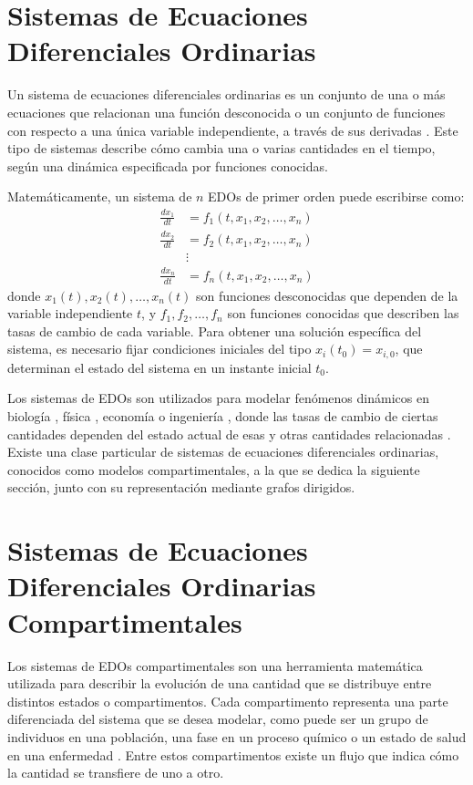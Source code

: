 \section{Sistemas de Ecuaciones Diferenciales Ordinarias}
\label{sec:edos}

Un sistema de ecuaciones diferenciales ordinarias es un conjunto de una o más ecuaciones que relacionan una función desconocida o un conjunto de funciones 
con respecto a una única variable independiente, a través de sus derivadas \cite{BoyceDiPrima17, Zill13}. Este tipo de sistemas describe cómo cambia una o varias 
cantidades en el tiempo, según una dinámica especificada por funciones conocidas.

Matemáticamente, un sistema de \( n \) EDOs de primer orden puede escribirse como:
\begin{align*}
\frac{dx_1}{dt} &= f_1(t, x_1, x_2, \ldots, x_n) \\
\frac{dx_2}{dt} &= f_2(t, x_1, x_2, \ldots, x_n) \\
&\vdots \\
\frac{dx_n}{dt} &= f_n(t, x_1, x_2, \ldots, x_n)
\end{align*}
donde \( x_1(t), x_2(t), \ldots, x_n(t) \) son funciones desconocidas que dependen de la variable independiente \( t \), y \( f_1, f_2, \ldots, f_n \) son funciones 
conocidas que describen las tasas de cambio de cada variable. Para obtener una solución específica del sistema, es necesario fijar condiciones iniciales del 
tipo \( x_i(t_0) = x_{i,0} \), que determinan el estado del sistema en un instante inicial \( t_0 \).

Los sistemas de EDOs son utilizados para modelar fenómenos dinámicos en biología \cite{murray2002}, física \cite{strogatz2015}, economía \cite{chiang2005} o 
ingeniería \cite{ljung1999}, donde las tasas de cambio de ciertas cantidades dependen del estado actual de esas y otras cantidades relacionadas \cite{Arnold73}. 
Existe una clase particular de sistemas de ecuaciones diferenciales ordinarias, conocidos como modelos compartimentales, a la que se dedica la siguiente sección, 
junto con su representación mediante grafos dirigidos.

\section{Sistemas de Ecuaciones Diferenciales Ordinarias Compartimentales}
\label{sec:compartimental}

Los sistemas de EDOs compartimentales son una herramienta matemática utilizada para describir la evolución de una cantidad que se distribuye entre distintos estados o 
compartimentos. Cada compartimento representa una parte diferenciada del sistema que se desea modelar, como puede ser un grupo de individuos en una población, 
una fase en un proceso químico o un estado de salud en una enfermedad \cite{murray2002,atkins2014}. Entre estos compartimentos existe un flujo que indica cómo la 
cantidad se transfiere de uno a otro.


